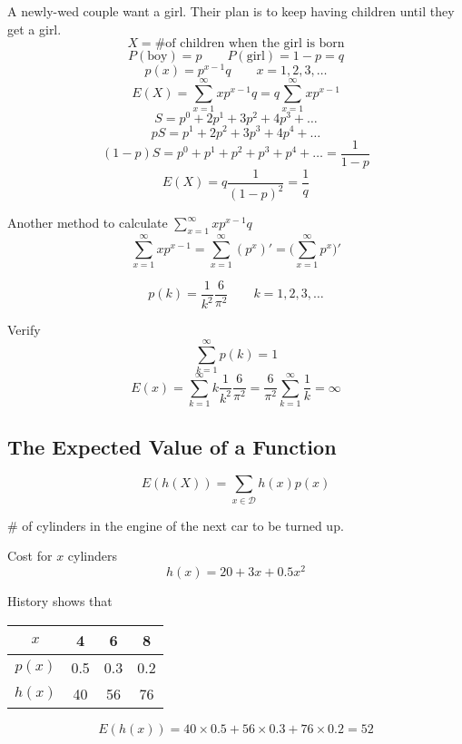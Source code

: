 \begin{exmp}
A newly-wed couple want a girl. Their plan is to keep having children until they get a girl.
\[  X=\text{\# of children when the girl is born}   \]
\[  P(\text{boy})=p \qquad P(\text{girl})=1-p=q     \]
\[	p(x)=p^{x-1}q \qquad x=1,2,3,\dots	\]
\[	E(X)=\sum_{x=1}^{\infty} xp^{x-1}q= q\sum_{x=1}^{\infty}xp^{x-1}	\]
\[	S=p^0+2p^1+3p^2+4p^3+\dots \]
\[	pS=p^1+2p^2+3p^3+4p^4+\dots \]
\[	(1-p)S=p^0+p^1+p^2+p^3+p^4+\dots=\frac{1}{1-p}\]
\[	E(X)=q\frac{1}{(1-p)^2}=\frac{1}{q}\]

Another method to calculate $\sum_{x=1}^{\infty} xp^{x-1}q$
\[	\sum_{x=1}^{\infty} xp^{x-1}=\sum_{x=1}^{\infty}(p^{x})'=\Big( \sum_{x=1}^{\infty}p^{x} \Big)'	\]
\end{exmp}

\begin{exmp}
\[	p(k)=\frac{1}{k^2}\frac{6}{\pi^2}	\qquad k=1,2,3,\dots\]

Verify 
\[\sum_{k=1}^{\infty} p(k)=1\]
\[E(x)=\sum_{k=1}^{\infty} k\frac{1}{k^2}\frac{6}{\pi^2}		=\frac{6}{\pi^2}\sum_{k=1}^{\infty}\frac{1}{k}=\infty	\]
\end{exmp}


\subsection{The Expected Value of a Function}
\begin{prop}
\[E(h(X))=\sum_{x\in \mathcal{D}}h(x)p(x)\]
\end{prop}

\begin{exmp}
\# of cylinders in the engine of the next car to be turned up.

Cost for $x$ cylinders
\[	h(x)=20+3x+0.5 x^2		\]

History shows that 
\begin{center}
  \begin{tabular}{c|ccc}
  \hline
  $x$  & 4 & 6 & 8 \\
  \hline
  $p(x)$  & 0.5 & 0.3  & 0.2  \\
  $h(x)$  & 40 & 56 & 76 \\
  \hline
  \end{tabular}
\end{center}
  
 \vspace{4mm}

 \[	E(h(x))=40\times0.5 +56\times 0.3+76\times 0.2 = \boxed{52}\]
\end{exmp}


